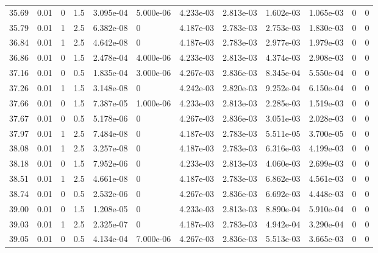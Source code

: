 \documentclass[preview]{standalone}
\begin{document}
{{{{{\begin{tabular}{L{1.2cm}C{1.2cm} C{0.3cm}C{0.5cm} C{1.4cm}C{1.4cm} C{1.4cm}C{1.4cm} C{1.6cm}C{1.6cm} C{1.6cm}C{1.6cm}}
  35.69  &  0.01  & 0     & 1.5 &  3.095e-04  & 5.000e-06  &  4.233e-03&   2.813e-03& 1.602e-03 & 1.065e-03   &  0 & 0  \\ 
  35.79  &  0.01  & 1     & 2.5 &  6.382e-08  & 0  &  4.187e-03&   2.783e-03& 2.753e-03 & 1.830e-03   &  0 & 0  \\ 
  36.84  &  0.01  & 1     & 2.5 &  4.642e-08  & 0  &  4.187e-03&   2.783e-03& 2.977e-03 & 1.979e-03   &  0 & 0  \\ 
  36.86  &  0.01  & 0     & 1.5 &  2.478e-04  & 4.000e-06  &  4.233e-03&   2.813e-03& 4.374e-03 & 2.908e-03   &  0 & 0  \\ 
  37.16  &  0.01  & 0     & 0.5 &  1.835e-04  & 3.000e-06  &  4.267e-03&   2.836e-03& 8.345e-04 & 5.550e-04   &  0 & 0  \\ 
  37.26  &  0.01  & 1     & 1.5 &  3.148e-08  & 0  &  4.242e-03&   2.820e-03& 9.252e-04 & 6.150e-04   &  0 & 0  \\ 
  37.66  &  0.01  & 0     & 1.5 &  7.387e-05  & 1.000e-06  &  4.233e-03&   2.813e-03& 2.285e-03 & 1.519e-03   &  0 & 0  \\ 
  37.67  &  0.01  & 0     & 0.5 &  5.178e-06  & 0  &  4.267e-03&   2.836e-03& 3.051e-03 & 2.028e-03   &  0 & 0  \\ 
  37.97  &  0.01  & 1     & 2.5 &  7.484e-08  & 0  &  4.187e-03&   2.783e-03& 5.511e-05 & 3.700e-05   &  0 & 0  \\ 
  38.08  &  0.01  & 1     & 2.5 &  3.257e-08  & 0  &  4.187e-03&   2.783e-03& 6.316e-03 & 4.199e-03   &  0 & 0  \\ 
  38.18  &  0.01  & 0     & 1.5 &  7.952e-06  & 0  &  4.233e-03&   2.813e-03& 4.060e-03 & 2.699e-03   &  0 & 0  \\ 
  38.51  &  0.01  & 1     & 2.5 &  4.661e-08  & 0  &  4.187e-03&   2.783e-03& 6.862e-03 & 4.561e-03   &  0 & 0  \\ 
  38.74  &  0.01  & 0     & 0.5 &  2.532e-06  & 0  &  4.267e-03&   2.836e-03& 6.692e-03 & 4.448e-03   &  0 & 0  \\ 
  39.00  &  0.01  & 0     & 1.5 &  1.208e-05  & 0  &  4.233e-03&   2.813e-03& 8.890e-04 & 5.910e-04   &  0 & 0  \\ 
  39.03  &  0.01  & 1     & 2.5 &  2.325e-07  & 0  &  4.187e-03&   2.783e-03& 4.942e-04 & 3.290e-04   &  0 & 0  \\ 
  39.05  &  0.01  & 0     & 0.5 &  4.134e-04  & 7.000e-06  &  4.267e-03&   2.836e-03& 5.513e-03 & 3.665e-03   &  0 & 0  \\ 
\hline 
\end{tabular} 

}}}}}
\end{document}
